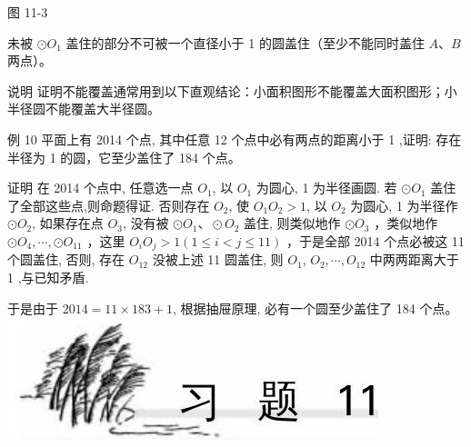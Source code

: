 \documentclass[10pt]{article}
\begin{document}
图 11-3

未被 $\odot O_{1}$ 盖住的部分不可被一个直径小于 1 的圆盖住（至少不能同时盖住 $A 、 B$ 两点）。

说明 证明不能覆盖通常用到以下直观结论：小面积图形不能覆盖大面积图形；小半径圆不能覆盖大半径圆。

例 10 平面上有 2014 个点, 其中任意 12 个点中必有两点的距离小于 1 ,证明: 存在半径为 1 的圆，它至少盖住了 184 个点。

证明 在 2014 个点中, 任意选一点 $O_{1}$, 以 $O_{1}$ 为圆心, 1 为半径画圆. 若 $\odot O_{1}$ 盖住了全部这些点,则命题得证. 否则存在 $O_{2}$, 使 $O_{1} O_{2}>1$, 以 $O_{2}$ 为圆心, 1 为半径作 $\odot O_{2}$, 如果存在点 $O_{3}$, 没有被 $\odot O_{1} 、 \odot O_{2}$ 盖住, 则类似地作 $\odot O_{3}$ ，类似地作 $\odot O_{4}, \cdots, \odot O_{11}$ ，这里 $O_{i} O_{j}>1(1 \leqslant i<j \leqslant 11)$ ，于是全部 2014 个点必被这 11 个圆盖住, 否则, 存在 $O_{12}$ 没被上述 11 圆盖住, 则 $O_{1}$, $O_{2}, \cdots, O_{12}$ 中两两距离大于 1 ,与已知矛盾.

于是由于 $2014=11 \times 183+1$, 根据抽屉原理, 必有一个圆至少盖住了 184 个点。\\
\includegraphics[max width=\textwidth, center]{2024_10_30_66b8e5e701da2093c133g-084}
\end{document}
